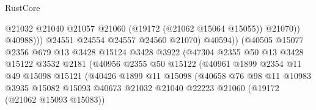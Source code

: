 \begin{lexlean}{RustCore}
\begin{coremodule}
                                              @21032
                                              @21040
                                              @21057
                                              @21060
                                              (@19172 (@21062 @15064 @15055))
                                              @21070))
                                          @40988)))
                                    @24551
                                    @24554
                                    @24557
                                    @24560
                                    @21070)
                                  @40594))
                              (@40505
                                @15077
                                @2356
                                @679
                                @13
                                @3428
                                @15124
                                @3428
                                @3922
                                (@47304
                                  @2355
                                  @50
                                  @13
                                  @3428
                                  @15122
                                  @3532
                                  @2181
                                  (@40956
                                    @2355
                                    @50
                                    @15122
                                    (@40961
                                      @1899
                                      @2354
                                      @11
                                      @49
                                      @15098
                                      @15121
                                      (@40426
                                        @1899
                                        @11
                                        @15098
                                        (@40658
                                          @76
                                          @98
                                          @11
                                          @10983
                                          @3935
                                          @15082
                                          @15093
                                          @40673
                                          @21032
                                          @21040
                                          @22223
                                          @21060
                                          (@19172 (@21062 @15093 @15083))

\end{coremodule}
\end{lexlean}
